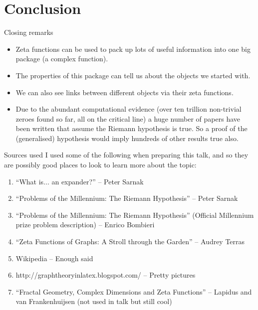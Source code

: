 \documentclass{beamer}
\begin{document}
\section{Conclusion}
\begin{frame}{Closing remarks}
\begin{itemize}
\item Zeta functions can be used to pack up lots of useful information into one big package (a complex function).
\pause\item The properties of this package can tell us about the objects we started with.
\pause\item We can also see links between different objects via their zeta functions.
\pause\item Due to the abundant computational evidence (over ten trillion non-trivial zeroes found so far, all on the critical line) a huge number of papers have been written that assume the Riemann hypothesis is true.
So a proof of the (generalised) hypothesis would imply hundreds of other results true also.
\end{itemize}
\end{frame}

\begin{frame}{Sources used}
I used some of the following when preparing this talk, and so they are possibly good places to look to learn more about the topic:
\begin{enumerate}
\item ``What is... an expander?'' -- Peter Sarnak
\item ``Problems of the Millennium: The Riemann Hypothesis'' -- Peter Sarnak
\item ``Problems of the Millennium: The Riemann Hypothesis'' (Official Millennium prize problem description) -- Enrico Bombieri
\item ``Zeta Functions of Graphs: A Stroll through the Garden'' -- Audrey Terras
\item Wikipedia -- Enough said
\item http://graphtheoryinlatex.blogspot.com/ -- Pretty pictures
\item ``Fractal Geometry, Complex Dimensions and Zeta Functions'' -- Lapidus and van Frankenhuijsen (not used in talk but still cool)
\end{enumerate}
\end{frame}
\end{document}
